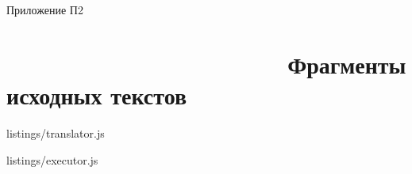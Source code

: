 \clearpage
\begin{flushleft}
	Приложение П2
\end{flushleft}

\section[Приложение П2. Фрагменты исходных текстом]{                      Фрагменты исходных текстов}

\renewcommand{\thelstlisting}{П2.\arabic{lstlisting}}
\setcounter{lstlisting}{0}



{listings/translator.js}


{listings/executor.js}
